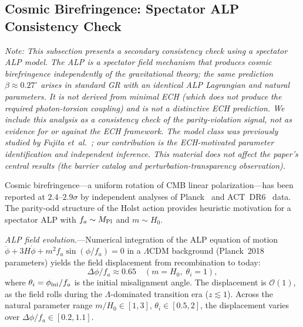 \documentclass[aps,prd,twocolumn,superscriptaddress,showpacs,preprintnumbers,nofootinbib,longbibliography,floatfix]{revtex4-2}
\newcommand{\MPl}{M_{\rm Pl}}
\newcommand{\etal}{\textit{et~al.}}
\begin{document}
\subsection{Cosmic Birefringence: Spectator ALP Consistency Check}\label{sec:birefringence_check}

\textit{Note: This subsection presents a secondary consistency check using a spectator ALP model. The ALP is a spectator field mechanism that produces cosmic birefringence independently of the gravitational theory; the same prediction $\beta \approx 0.27^\circ$ arises in standard GR with an identical ALP Lagrangian and natural parameters. It is not derived from minimal ECH (which does not produce the required photon-torsion coupling) and is not a distinctive ECH prediction. We include this analysis as a consistency check of the parity-violation signal, not as evidence for or against the ECH framework. The model class was previously studied by Fujita \etal~\cite{Fujita2021}; our contribution is the ECH-motivated parameter identification and independent inference. This material does not affect the paper's central results (the barrier catalog and perturbation-transparency observation).}

Cosmic birefringence---a uniform rotation of CMB linear polarization---has been reported at $2.4$--$2.9\sigma$ by independent analyses of Planck~\cite{Minami2020,Eskilt2022} and ACT~DR6~\cite{DiegoPalazuelos2025} data. The parity-odd structure of the Holst action provides heuristic motivation for a spectator ALP with $f_a \sim \MPl$ and $m \sim H_0$.

\textit{ALP field evolution.}---Numerical integration of the ALP equation of motion $\ddot\phi + 3H\dot\phi + m^2 f_a\sin(\phi/f_a) = 0$ in a $\Lambda$CDM background (Planck~2018 parameters) yields the field displacement from recombination to today:
\begin{equation}
\Delta\phi/f_a \approx 0.65 \quad (m = H_0,\; \theta_i = 1),
\end{equation}
where $\theta_i = \phi_{\rm ini}/f_a$ is the initial misalignment angle. The displacement is $\mathcal{O}(1)$, as the field rolls during the $\Lambda$-dominated transition era ($z \lesssim 1$). Across the natural parameter range $m/H_0 \in [1, 3]$, $\theta_i \in [0.5, 2]$, the displacement varies over $\Delta\phi/f_a \in [0.2, 1.1]$.
\end{document}
